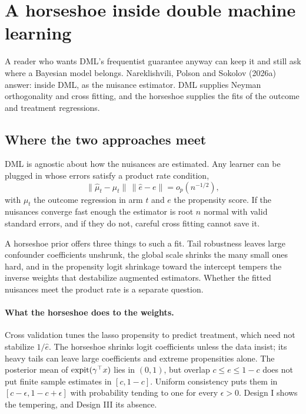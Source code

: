 \section{A horseshoe inside double machine learning}\label{sec:baipw}

A reader who wants DML's frequentist guarantee anyway can keep it and still ask where a Bayesian model belongs. Nareklishvili, Polson and Sokolov (2026a) answer: inside DML, as the nuisance estimator. DML supplies Neyman orthogonality and cross fitting, and the horseshoe supplies the fits of the outcome and treatment regressions.



\subsection{Where the two approaches meet}

DML is agnostic about how the nuisances are estimated. Any learner can be plugged in whose errors satisfy a product rate condition,
\[
\|\hat\mu_t - \mu_t\|\,\|\hat e - e\| = o_p(n^{-1/2}),
\]
with $\mu_t$ the outcome regression in arm $t$ and $e$ the propensity score. If the nuisances converge fast enough the estimator is root $n$ normal with valid standard errors, and if they do not, careful cross fitting cannot save it. 

A horseshoe prior offers three things to such a fit. Tail robustness leaves large confounder coefficients unshrunk, the global scale shrinks the many small ones hard, and in the propensity logit shrinkage toward the intercept tempers the inverse weights that destabilize augmented estimators. Whether the fitted nuisances meet the product rate is a separate question.

\paragraph{What the horseshoe does to the weights.} Cross validation tunes the lasso propensity to predict treatment, which need not stabilize $1/\hat e$. The horseshoe shrinks logit coefficients unless the data insist; its heavy tails can leave large coefficients and extreme propensities alone. The posterior mean of $\operatorname{expit}(\gamma^\top x)$ lies in $(0,1)$, but overlap $c \leq e \leq 1 - c$ does not put finite sample estimates in $[c, 1 - c]$. Uniform consistency puts them in $[c - \epsilon, 1 - c + \epsilon]$ with probability tending to one for every $\epsilon > 0$. Design I shows the tempering, and Design III its absence.

